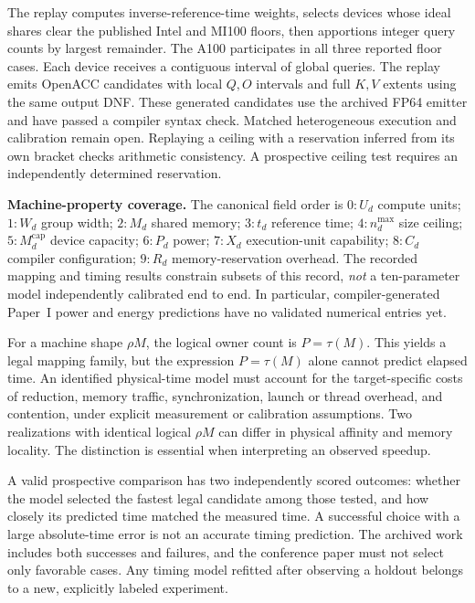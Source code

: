 \documentclass[sigplan,10pt,review,anonymous,balance=false,pbalance=false]{acmart}
\begin{document}
The replay computes inverse-reference-time weights, selects devices whose ideal shares clear the published Intel and MI100 floors, then apportions integer query counts by largest remainder. The A100 participates in all three reported floor cases. Each device receives a contiguous interval of global queries. The replay emits OpenACC candidates with local $Q,O$ intervals and full $K,V$ extents using the same output DNF. These generated candidates use the archived FP64 emitter and have passed a compiler syntax check. Matched heterogeneous execution and calibration remain open. Replaying a ceiling with a reservation inferred from its own bracket checks arithmetic consistency. A prospective ceiling test requires an independently determined reservation.

\noindent\textbf{Machine-property coverage.} The canonical field order is $0:U_d$ compute units; $1:W_d$ group width; $2:M_d$ shared memory; $3:t_d$ reference time; $4:n_d^{\max}$ size ceiling; $5:M_d^{\mathrm{cap}}$ device capacity; $6:P_d$ power; $7:X_d$ execution-unit capability; $8:C_d$ compiler configuration; $9:R_d$ memory-reservation overhead. The recorded mapping and timing results constrain subsets of this record, \emph{not} a ten-parameter model independently calibrated end to end. In particular, compiler-generated Paper~I power and energy predictions have no validated numerical entries yet.


For a machine shape $\rho M$, the logical owner count is $P=\tau(M)$. This yields a legal mapping family, but the expression $P=\tau(M)$ alone cannot predict elapsed time. An identified physical-time model must account for the target-specific costs of reduction, memory traffic, synchronization, launch or thread overhead, and contention, under explicit measurement or calibration assumptions. Two realizations with identical logical $\rho M$ can differ in physical affinity and memory locality. The distinction is essential when interpreting an observed speedup.

A valid prospective comparison has two independently scored outcomes: whether the model selected the fastest legal candidate among those tested, and how closely its predicted time matched the measured time. A successful choice with a large absolute-time error is not an accurate timing prediction. The archived work includes both successes and failures, and the conference paper must not select only favorable cases. Any timing model refitted after observing a holdout belongs to a new, explicitly labeled experiment.
\end{document}
